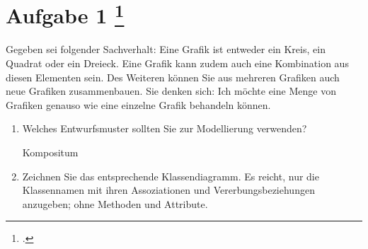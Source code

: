\documentclass{lehramt-informatik-aufgabe}
\begin{document}
\section{Aufgabe 1
\footcite{66116:2019:03}}

Gegeben sei folgender Sachverhalt: Eine Grafik ist entweder ein Kreis,
ein Quadrat oder ein Dreieck. Eine Grafik kann zudem auch eine
Kombination aus diesen Elementen sein. Des Weiteren können Sie aus
mehreren Grafiken auch neue Grafiken zusammenbauen. Sie denken sich: Ich
möchte eine Menge von Grafiken genauso wie eine einzelne Grafik
behandeln können.
\begin{enumerate}


\item Welches Entwurfsmuster sollten Sie zur Modellierung verwenden?

\begin{liAntwort}
Kompositum
\end{liAntwort}


\item Zeichnen Sie das entsprechende Klassendiagramm. Es reicht, nur die
Klassennamen mit ihren Assoziationen und Vererbungsbeziehungen
anzugeben; \dh ohne Methoden und Attribute.

\begin{liExkurs}[Kompositum]
\liEntwurfsKompositumUml
\end{liExkurs}

\begin{liAntwort}

\end{liAntwort}

\end{enumerate}
\end{document}
